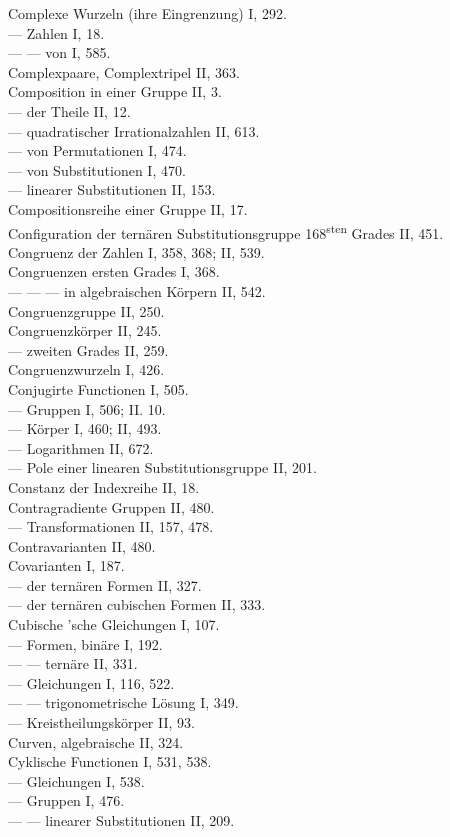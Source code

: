 Complexe Wurzeln (ihre Eingrenzung) I, 292.\\
--- Zahlen I, 18.\\
--- --- von  I, 585.\\
Complexpaare, Complextripel II, 363.\\
Composition in einer Gruppe II, 3.\\
--- der Theile II, 12.\\
--- quadratischer Irrationalzahlen II, 613.\\
--- von Permutationen I, 474.\\
--- von Substitutionen I, 470.\\
--- linearer Substitutionen II, 153.\\
Compositionsreihe einer Gruppe II, 17.\\
Configuration der tern\"aren Substitutionsgruppe 168\textsuperscript{sten} Grades II, 451.\\
Congruenz der Zahlen I, 358, 368; II, 539.\\
Congruenzen ersten Grades I, 368.\\
--- --- --- in algebraischen K\"orpern II, 542.\\
Congruenzgruppe II, 250.\\
Congruenzk\"orper II, 245.\\
--- zweiten Grades II, 259.\\
Congruenzwurzeln I, 426.\\
Conjugirte Functionen I, 505.\\
--- Gruppen I, 506; II. 10.\\ %
--- K\"orper I, 460; II, 493.\\
--- Logarithmen II, 672.\\
--- Pole einer linearen Substitutionsgruppe II, 201.\\
Constanz der Indexreihe II, 18.\\
Contragradiente Gruppen II, 480.\\
--- Transformationen II, 157, 478.\\
Contravarianten II, 480.\\
Covarianten I, 187.\\
--- der tern\"aren Formen II, 327.\\
--- der tern\"aren cubischen Formen II, 333.\\
Cubische 'sche Gleichungen I, 107.\\
--- Formen, bin\"are I, 192.\\
--- --- tern\"are II, 331.\\
--- Gleichungen I, 116, 522.\\
--- --- trigonometrische L\"osung I, 349.\\
--- Kreistheilungsk\"orper II, 93.\\
Curven, algebraische II, 324.\\
Cyklische Functionen I, 531, 538.\\
--- Gleichungen I, 538.\\
--- Gruppen I, 476.\\
--- --- linearer Substitutionen II, 209.\\
